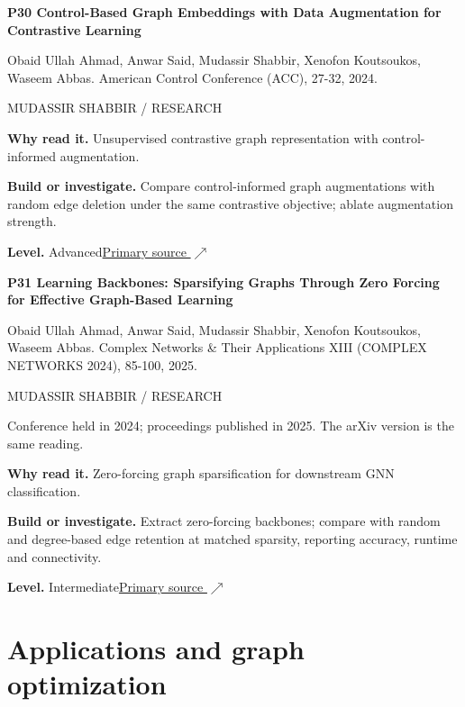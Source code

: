 \documentclass[11pt,letterpaper]{article}
\begin{document}
\begin{minipage}{\linewidth}
{\large\bfseries P30 Control-Based Graph Embeddings with Data Augmentation for Contrastive Learning}\par
Obaid Ullah Ahmad, Anwar Said, Mudassir Shabbir, Xenofon Koutsoukos, Waseem Abbas. American Control Conference (ACC), 27-32, 2024.\par
\textcolor{ink}{\small MUDASSIR SHABBIR / RESEARCH}\par
\textbf{Why read it.} Unsupervised contrastive graph representation with control-informed augmentation.\par
\textbf{Build or investigate.} Compare control-informed graph augmentations with random edge deletion under the same contrastive objective; ablate augmentation strength.\par
\textbf{Level.} Advanced\quad\href{https://doi.org/10.23919/ACC60939.2024.10644876}{Primary source $\nearrow$}\par
\end{minipage}\par\vspace{10pt}
\begin{minipage}{\linewidth}
{\large\bfseries P31 Learning Backbones: Sparsifying Graphs Through Zero Forcing for Effective Graph-Based Learning}\par
Obaid Ullah Ahmad, Anwar Said, Mudassir Shabbir, Xenofon Koutsoukos, Waseem Abbas. Complex Networks \& Their Applications XIII (COMPLEX NETWORKS 2024), 85-100, 2025.\par
\textcolor{ink}{\small MUDASSIR SHABBIR / RESEARCH}\par
{\small Conference held in 2024; proceedings published in 2025. The arXiv version is the same reading.}\par
\textbf{Why read it.} Zero-forcing graph sparsification for downstream GNN classification.\par
\textbf{Build or investigate.} Extract zero-forcing backbones; compare with random and degree-based edge retention at matched sparsity, reporting accuracy, runtime and connectivity.\par
\textbf{Level.} Intermediate\quad\href{https://doi.org/10.1007/978-3-031-82427-2_8}{Primary source $\nearrow$}\par
\end{minipage}\par\vspace{10pt}
\section*{Applications and graph optimization}
\end{document}

